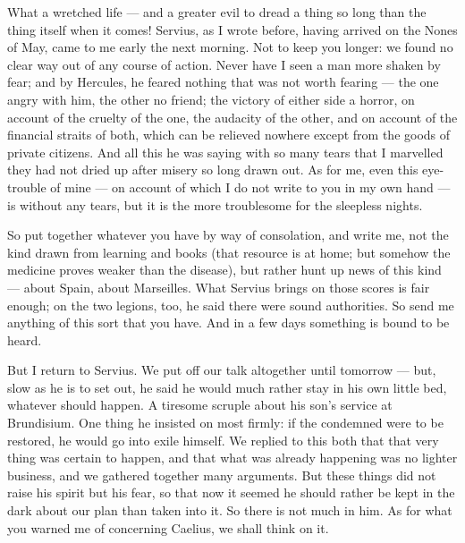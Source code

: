 

 What a wretched life --- and a greater evil to dread a thing so long than the thing itself when it comes! Servius, as I wrote before, having arrived on the Nones of May, came to me early the next morning. Not to keep you longer: we found no clear way out of any course of action. Never have I seen a man more shaken by fear; and by Hercules, he feared nothing that was not worth fearing --- the one angry with him, the other no friend; the victory of either side a horror, on account of the cruelty of the one, the audacity of the other, and on account of the financial straits of both, which can be relieved nowhere except from the goods of private citizens. And all this he was saying with so many tears that I marvelled they had not dried up after misery so long drawn out. As for me, even this eye-trouble of mine --- on account of which I do not write to you in my own hand --- is without any tears, but it is the more troublesome for the sleepless nights.

 So put together whatever you have by way of consolation, and write me, not the kind drawn from learning and books (that resource is at home; but somehow the medicine proves weaker than the disease), but rather hunt up news of this kind --- about Spain, about Marseilles. What Servius brings on those scores is fair enough; on the two legions, too, he said there were sound authorities. So send me anything of this sort that you have. And in a few days something is bound to be heard.

 But I return to Servius. We put off our talk altogether until tomorrow --- but, slow as he is to set out, he said he would much rather stay in his own little bed, whatever should happen. A tiresome scruple about his son's service at Brundisium. One thing he insisted on most firmly: if the condemned were to be restored, he would go into exile himself. We replied to this both that that very thing was certain to happen, and that what was already happening was no lighter business, and we gathered together many arguments. But these things did not raise his spirit but his fear, so that now it seemed he should rather be kept in the dark about our plan than taken into it. So there is not much in him. As for what you warned me of concerning Caelius, we shall think on it.
